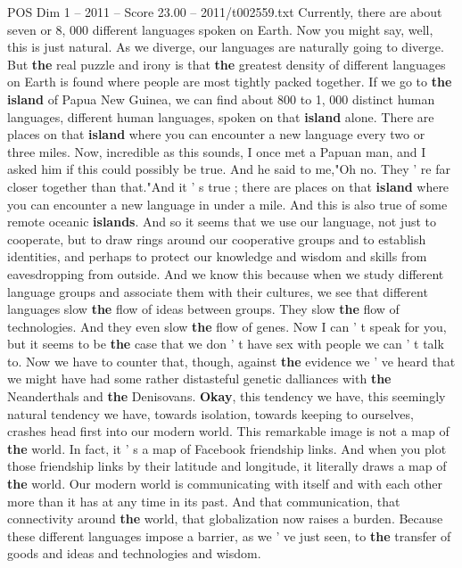 \begin{textsample}{POS Dim 1 – 2011 – Score 23.00 – 2011/t002559.txt}
Currently, there are about seven or 8, 000 different languages spoken on Earth.
Now you might say, well, this is just natural.
As we diverge, our languages are naturally going to diverge.
But \textbf{the} real puzzle and irony is that \textbf{the} greatest density of different languages on Earth is found where people are most tightly packed together.
If we go to \textbf{the} \textbf{island} of Papua New Guinea, we can find about 800 to 1, 000 distinct human languages, different human languages, spoken on that \textbf{island} alone.
There are places on that \textbf{island} where you can encounter a new language every two or three miles.
Now, incredible as this sounds, I once met a Papuan man, and I asked him if this could possibly be true.
And he said to me,"Oh no.
They ' re far closer together than that."And it ' s true ; there are places on that \textbf{island} where you can encounter a new language in under a mile.
And this is also true of some remote oceanic \textbf{islands}.
And so it seems that we use our language, not just to cooperate, but to draw rings around our cooperative groups and to establish identities, and perhaps to protect our knowledge and wisdom and skills from eavesdropping from outside.
And we know this because when we study different language groups and associate them with their cultures, we see that different languages slow \textbf{the} flow of ideas between groups.
They slow \textbf{the} flow of technologies.
And they even slow \textbf{the} flow of genes.
Now I can ' t speak for you, but it seems to be \textbf{the} case that we don ' t have sex with people we can ' t talk to.
Now we have to counter that, though, against \textbf{the} evidence we ' ve heard that we might have had some rather distasteful genetic dalliances with \textbf{the} Neanderthals and \textbf{the} Denisovans. \textbf{Okay}, this tendency we have, this seemingly natural tendency we have, towards isolation, towards keeping to ourselves, crashes head first into our modern world.
This remarkable image is not a map of \textbf{the} world.
In fact, it ' s a map of Facebook friendship links.
And when you plot those friendship links by their latitude and longitude, it literally draws a map of \textbf{the} world.
Our modern world is communicating with itself and with each other more than it has at any time in its past.
And that communication, that connectivity around \textbf{the} world, that globalization now raises a burden.
Because these different languages impose a barrier, as we ' ve just seen, to \textbf{the} transfer of goods and ideas and technologies and wisdom.

\end{textsample}
